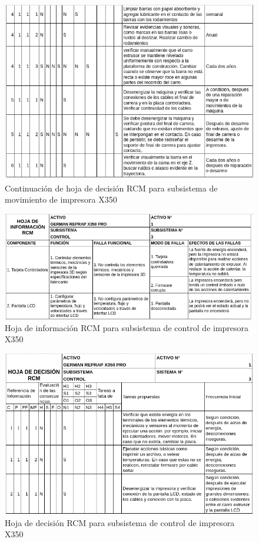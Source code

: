 \begin{figure}[H]
\centering
\includegraphics[scale=0.7]{images/decision22.png}
\caption{Continuación de hoja de decisión RCM para subsistema de movimiento de impresora X350}
\end{figure}

\begin{figure}[H]
\centering
\includegraphics[scale=0.7]{images/amef31.png}
\caption{Hoja de información RCM para subsistema de control de impresora X350}
\end{figure}

\begin{figure}[H]
\centering
\includegraphics[scale=0.7]{images/decision31.png}
\caption{Hoja de decisión RCM para subsistema de control de impresora X350}
\end{figure}

